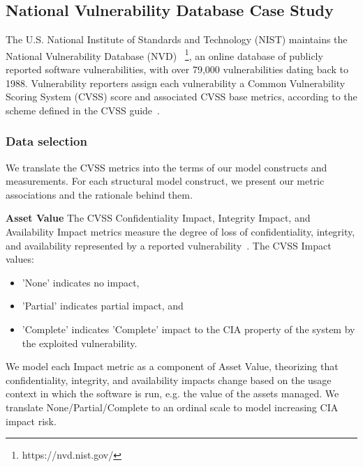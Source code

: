 \subsection{National Vulnerability Database Case Study}
\label{sec:evaluation_nvd}
The U.S. National Institute of Standards and Technology (NIST) maintains the National Vulnerability Database (NVD) ~\footnote{https://nvd.nist.gov/}, an online database of publicly reported software vulnerabilities, with over 79,000 vulnerabilities dating back to 1988. Vulnerability reporters assign each vulnerability a Common Vulnerability Scoring System (CVSS) score and associated CVSS base metrics, according to the scheme defined in the CVSS guide~\cite{mell2007complete}.  

\subsubsection{Data selection}
\label{sec:evaluation_nvd_selection}
 We translate the CVSS metrics into the terms of our model constructs and measurements. For each structural model construct, we present our metric associations and the rationale behind them.
 
\textbf{Asset Value}
The CVSS Confidentiality Impact, Integrity Impact, and Availability Impact metrics measure the degree of loss of confidentiality, integrity, and availability represented by a reported vulnerability~\cite{mell2007complete}. The CVSS Impact values:
	\begin{itemize}
		\item 'None' indicates no impact, 
		\item 'Partial' indicates partial impact, and 
		\item 'Complete' indicates 'Complete' impact to the CIA property of the system by the exploited vulnerability.  
	\end{itemize}
We model each Impact metric as a component of Asset Value, theorizing that confidentiality, integrity, and availability impacts change based on the usage context in which the software is run, e.g. the value of the assets managed. We translate None/Partial/Complete to an ordinal scale to model increasing CIA impact risk.

